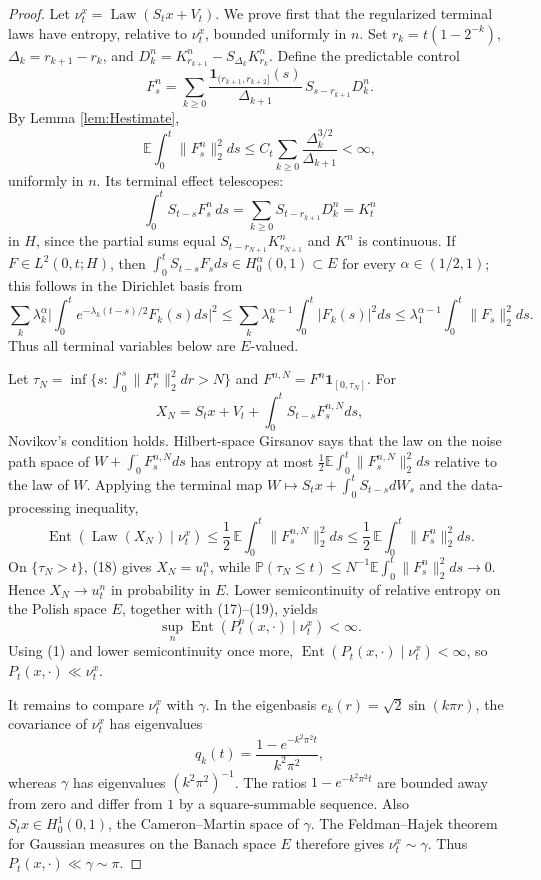 \documentclass[12pt]{article}
\newcommand{\E}{\mathbb E}
\newcommand{\1}{\mathbf 1}
\newcommand{\Law}{\operatorname{Law}}
\newcommand{\Ent}{\operatorname{Ent}}
\begin{document}
\begin{proof}
Let \(\nu_t^x=\Law(S_tx+V_t)\).  We prove first that the regularized terminal
laws have entropy, relative to \(\nu_t^x\), bounded uniformly in \(n\).  Set
\(r_k=t(1-2^{-k})\), \(\Delta_k=r_{k+1}-r_k\), and
\(D_k^n=K^n_{r_{k+1}}-S_{\Delta_k}K^n_{r_k}\).  Define the predictable
control
\[
 F_s^n=\sum_{k\ge0}\frac{\1_{(r_{k+1},r_{k+2}]}(s)}{\Delta_{k+1}}\,
        S_{s-r_{k+1}}D_k^n .                                \tag{16}
\]
By Lemma \ref{lem:Hestimate},
\[
 \E\int_0^t\|F_s^n\|_2^2ds
 \le C_t\sum_{k\ge0}\frac{\Delta_k^{3/2}}{\Delta_{k+1}}<\infty, \tag{17}
\]
uniformly in \(n\).  Its terminal effect telescopes:
\[
 \int_0^tS_{t-s}F_s^n\,ds
 =\sum_{k\ge0}S_{t-r_{k+1}}D_k^n=K_t^n                       \tag{18}
\]
in \(H\), since the partial sums equal \(S_{t-r_{N+1}}K^n_{r_{N+1}}\) and
\(K^n\) is continuous.  If \(F\in L^2(0,t;H)\), then
\(\int_0^tS_{t-s}F_sds\in H^\alpha_0(0,1)\subset E\) for every
\(\alpha\in(1/2,1)\); this follows in the Dirichlet basis from
\[
 \sum_k\lambda_k^\alpha\Big|\int_0^te^{-\lambda_k(t-s)/2}F_k(s)ds\Big|^2
 \le \sum_k\lambda_k^{\alpha-1}\int_0^t|F_k(s)|^2ds
 \le \lambda_1^{\alpha-1}\int_0^t\|F_s\|_2^2ds .
\]
Thus all terminal variables below are \(E\)-valued.

Let \(\tau_N=\inf\{s:\int_0^s\|F_r^n\|_2^2dr>N\}\) and
\(F^{n,N}=F^n\1_{[0,\tau_N]}\).  For
\[
 X_N=S_tx+V_t+\int_0^tS_{t-s}F_s^{n,N}ds ,
\]
Novikov's condition holds.  Hilbert-space Girsanov says that the law on the
noise path space of \(W+\int_0^\cdot F_s^{n,N}ds\) has entropy at most
\(\frac12\E\int_0^t\|F_s^{n,N}\|_2^2ds\) relative to the law of \(W\).
Applying the terminal map \(W\mapsto S_tx+\int_0^tS_{t-s}dW_s\) and the
data-processing inequality,
\[
 \Ent(\Law(X_N)\mid\nu_t^x)
 \le \frac12\,\E\int_0^t\|F_s^{n,N}\|_2^2ds
 \le \frac12\,\E\int_0^t\|F_s^n\|_2^2ds .                   \tag{19}
\]
On \(\{\tau_N>t\}\), (18) gives \(X_N=u_t^n\), while
\(\mathbb P(\tau_N\le t)\le N^{-1}\E\int_0^t\|F_s^n\|_2^2ds\to0\).  Hence
\(X_N\to u_t^n\) in probability in \(E\).  Lower semicontinuity of relative
entropy on the Polish space \(E\), together with (17)--(19), yields
\[
        \sup_n\Ent(P_t^n(x,\cdot)\mid\nu_t^x)<\infty .       \tag{20}
\]
Using (1) and lower semicontinuity once more,
\(\Ent(P_t(x,\cdot)\mid\nu_t^x)<\infty\), so \(P_t(x,\cdot)\ll\nu_t^x\).

It remains to compare \(\nu_t^x\) with \(\gamma\).  In the eigenbasis
\(e_k(r)=\sqrt2\sin(k\pi r)\), the covariance of \(\nu_t^x\) has eigenvalues
\[
        q_k(t)=\frac{1-e^{-k^2\pi^2t}}{k^2\pi^2},
\]
whereas \(\gamma\) has eigenvalues \((k^2\pi^2)^{-1}\).  The ratios
\(1-e^{-k^2\pi^2t}\) are bounded away from zero and differ from \(1\) by a
square-summable sequence.  Also \(S_tx\in H^1_0(0,1)\), the Cameron--Martin
space of \(\gamma\).  The Feldman--Hajek theorem for Gaussian measures on the
Banach space \(E\) therefore gives \(\nu_t^x\sim\gamma\).  Thus
\(P_t(x,\cdot)\ll\gamma\sim\pi\).
\end{proof}
\end{document}
